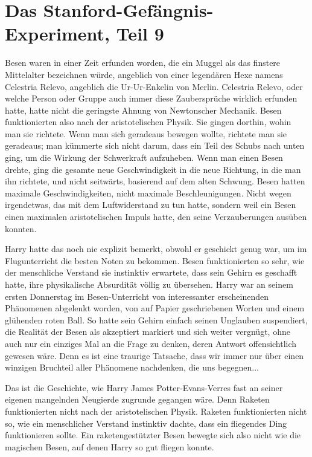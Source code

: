 \chapter{Das Stanford-Gefängnis-Experiment, Teil 9}

Besen waren in einer Zeit erfunden worden, die ein Muggel als das finstere
Mittelalter bezeichnen würde, angeblich von einer legendären Hexe namens
Celestria Relevo, angeblich die Ur-Ur-Enkelin von Merlin. Celestria Relevo, oder
welche Person oder Gruppe auch immer diese Zaubersprüche wirklich erfunden
hatte, hatte nicht die geringste Ahnung von Newtonscher Mechanik. Besen
funktionierten also nach der aristotelischen Physik. Sie gingen dorthin, wohin
man sie richtete. Wenn man sich geradeaus bewegen wollte, richtete man sie
geradeaus; man kümmerte sich nicht darum, dass ein Teil des Schubs nach unten
ging, um die Wirkung der Schwerkraft aufzuheben. Wenn man einen Besen drehte,
ging die gesamte neue Geschwindigkeit in die neue Richtung, in die man ihn
richtete, und nicht seitwärts, basierend auf dem alten Schwung. Besen hatten
maximale Geschwindigkeiten, nicht maximale Beschleunigungen. Nicht wegen
irgendetwas, das mit dem Luftwiderstand zu tun hatte, sondern weil ein Besen
einen maximalen aristotelischen Impuls hatte, den seine Verzauberungen ausüben
konnten.

Harry hatte das noch nie explizit bemerkt, obwohl er geschickt genug war, um im
Flugunterricht die besten Noten zu bekommen. Besen funktionierten so sehr, wie
der menschliche Verstand sie instinktiv erwartete, dass sein Gehirn es geschafft
hatte, ihre physikalische Absurdität völlig zu übersehen. Harry war an seinem
ersten Donnerstag im Besen-Unterricht von interessanter erscheinenden Phänomenen
abgelenkt worden, von auf Papier geschriebenen Worten und einem glühenden roten
Ball. So hatte sein Gehirn einfach seinen Unglauben suspendiert, die Realität
der Besen als akzeptiert markiert und sich weiter vergnügt, ohne auch nur ein
einziges Mal an die Frage zu denken, deren Antwort offensichtlich gewesen wäre.
Denn es ist eine traurige Tatsache, dass wir immer nur über einen winzigen
Bruchteil aller Phänomene nachdenken, die uns begegnen...

Das ist die Geschichte, wie Harry James Potter-Evans-Verres fast an seiner
eigenen mangelnden Neugierde zugrunde gegangen wäre. Denn Raketen funktionierten
nicht nach der aristotelischen Physik. Raketen funktionierten nicht so, wie ein
menschlicher Verstand instinktiv dachte, dass ein fliegendes Ding funktionieren
sollte. Ein raketengestützter Besen bewegte sich also nicht wie die magischen
Besen, auf denen Harry so gut fliegen konnte.

